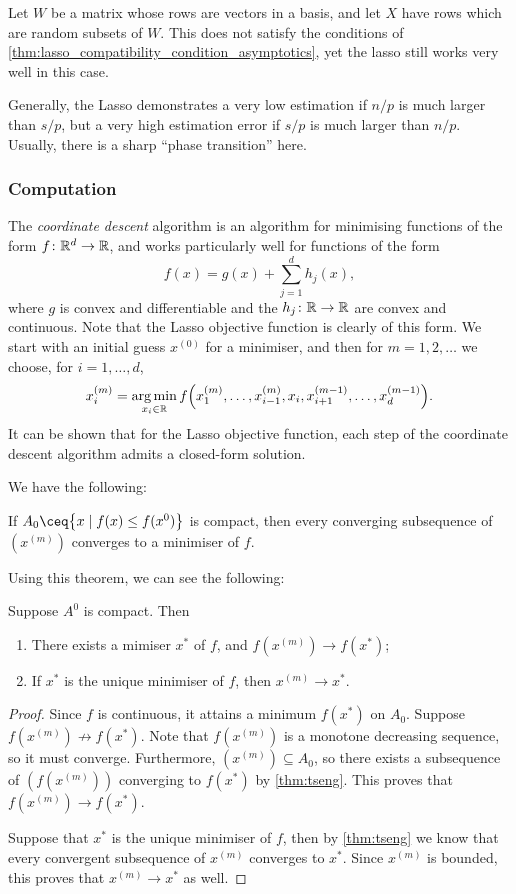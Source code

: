 \begin{example}
	Let $W$ be a matrix whose rows are vectors in a basis, and let $X$ have rows which are random subsets of $W$. This does not satisfy the conditions of \cref{thm:lasso_compatibility_condition_asymptotics}, yet the lasso still works very well in this case. 
\end{example}

Generally, the Lasso demonstrates a very low estimation if $n/p$ is much larger than $s/p$, but a very high estimation error if $s/p$ is much larger than $n/p$. Usually, there is a sharp ``phase transition'' here.

\subsubsection{Computation}
The \emph{coordinate descent} algorithm is an algorithm for minimising functions of the form $f \colon \mathbb R^d \to \mathbb R$, and works particularly well for functions of the form
\[
f(x) = g(x) + \sum_{j=1}^d h_j(x), 
\]
where $g$ is convex and differentiable and the $h_j \colon \mathbb R \to \mathbb R$ are convex and continuous. Note that the Lasso objective function is clearly of this form. 
We start with an initial guess $x^{(0)}$ for a minimiser, and then for $m = 1, 2, \dotsc$ we choose, for $i = 1, \dotsc, d$, 
\[
x^{(m)}_i = \operatorname*{arg\,min}_{x_i \in \mathbb R} f\qty(x_1^{(m)}, \dotsc, x_{i-1}^{(m)}, x_i, x_{i+1}^{(m-1)}, \dotsc, x_d^{(m-1)}). 
\]
It can be shown that for the Lasso objective function, each step of the coordinate descent algorithm admits a closed-form solution. 

We have the following:
\begin{theorem}[Tseng] \label{thm:tseng} If $A_0 \ceq \qty{x \mid f(x) \leq f(x^0)}$ is compact, then every converging subsequence of $(x^{(m)})$ converges to a minimiser of $f$. 
\end{theorem}

Using this theorem, we can see the following:
\begin{corollary}
	Suppose $A^0$ is compact. Then 
	\begin{enumerate}
		\item There exists a mimiser $x^*$ of $f$, and $f(x^{(m)}) \to f(x^*)$;
		\item If $x^*$ is the unique minimiser of $f$, then $x^{(m)} \to x^*$. 
	\end{enumerate}
\end{corollary}

\begin{proof}
	Since $f$ is continuous, it attains a minimum $f(x^*)$ on $A_0$. Suppose $f(x^{(m)}) \not\to f(x^*)$. Note that $f(x^{(m)})$ is a monotone decreasing sequence, so it must converge. Furthermore, $(x^{(m)}) \subseteq A_0$, so there exists a subsequence of $(f(x^{(m)}))$ converging to $f(x^*)$ by \cref{thm:tseng}. This proves that $f(x^{(m)}) \to f(x^*)$. 
	
	Suppose that $x^*$ is the unique minimiser of $f$, then by \cref{thm:tseng} we know that every convergent subsequence of $x^{(m)}$ converges to $x^*$. Since $x^{(m)}$ is bounded, this proves that $x^{(m)} \to x^*$ as well.  
\end{proof}

